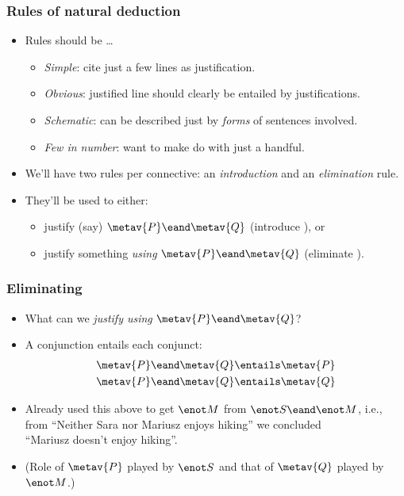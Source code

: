\begin{frame}
  \frametitle{Rules of natural deduction}

  \begin{itemize}[<+->]
    \item Rules should be \dots
      \begin{itemize}[<+->]
        \item \emph{Simple}: cite just a few lines as justification.
        \item \emph{Obvious}: justified line should clearly be entailed by justifications.
        \item \emph{Schematic}: can be described just by \emph{forms} of
        sentences involved.
        \item \emph{Few in number}: want to make do with just a handful.
      \end{itemize}
    \item We'll have two rules per connective: an \emph{introduction}
    and an \emph{elimination} rule.
    \item They'll be used to either:
    \begin{itemize}[<+->]
      \item justify (say) $\metav{P} \eand \metav{Q}$
    (introduce \eand), or 
    \item justify something \emph{using} $\metav{P}
    \eand \metav{Q}$ (eliminate \eand).
    \end{itemize}
  \end{itemize}
\end{frame}

\begin{frame}
  \frametitle{Eliminating \eand}

  \begin{itemize}[<+->]
    \item What can we \emph{justify using} $\metav{P} \eand \metav{Q}$?
    \item A conjunction entails each conjunct:
    \begin{align*}
      & \metav{P} \eand \metav{Q} \entails \metav{P}\\
      & \metav{P} \eand \metav{Q} \entails \metav{Q}
    \end{align*}
    \item Already used this above to get $\enot M$ from $\enot S \eand
    \enot M$, i.e., from ``Neither
    Sara nor Mariusz enjoys hiking'' we concluded\\
 ``Mariusz doesn't enjoy hiking''.
    \item (Role of $\metav{P}$ played by $\enot S$ and that of $\metav{Q}$
    played by $\enot M$.)
  \end{itemize}
\end{frame}

